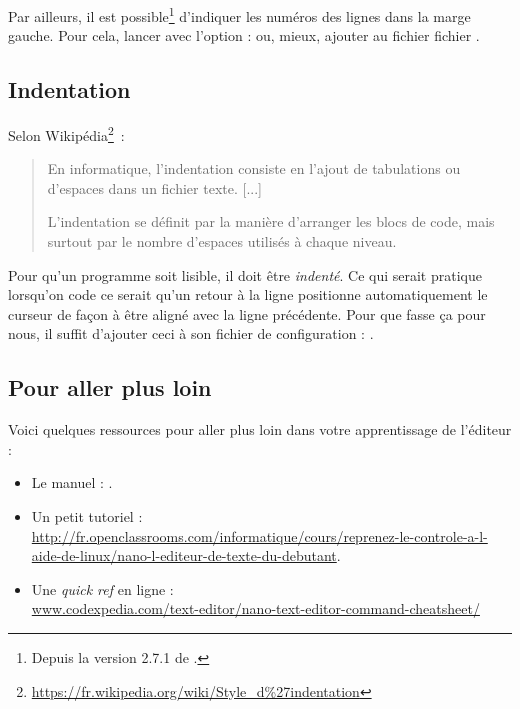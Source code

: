 \documentclass[a4paper,11pt]{style-esi/td}
\begin{document}
		Par ailleurs, il est possible\footnote{Depuis la version
		2.7.1 de .} d'indiquer les numéros des 
		lignes dans la
		marge gauche. Pour cela, lancer  avec l'option 
		 :  ou, mieux, 
	    ajouter  au fichier 
	    fichier .
			
	\subsection{Indentation}
				 
        Selon Wikipédia\footnote{\url{https://fr.wikipedia.org/wiki/Style_d\%27indentation}}~:
        \begin{quote}
        \og{}En informatique, l'indentation consiste en l'ajout de tabulations ou 
        d'espaces dans un fichier texte. [...]

        L'indentation se définit par la manière d'arranger les blocs de code, 
        mais surtout par le nombre d'espaces utilisés à chaque niveau.\fg{} 
        \end{quote}
        
		Pour qu'un programme soit lisible, 
		il doit être \textit{indenté}. 
		Ce qui serait pratique lorsqu'on code ce serait qu'un retour à la ligne 
		positionne automatiquement le curseur de façon à être 
		aligné avec la ligne précédente. 
		Pour que  fasse ça pour nous, 
		il suffit d'ajouter	ceci à son fichier de configuration : .
			
	\subsection{Pour aller plus loin} 
		
		Voici quelques ressources pour aller plus loin dans votre apprentissage de l'éditeur :
		\begin{itemize}
		\item Le manuel : .
		\item Un petit tutoriel : 
			\\{\tiny\url{http://fr.openclassrooms.com/informatique/cours/reprenez-le-controle-a-l-aide-de-linux/nano-l-editeur-de-texte-du-debutant}}.
		\item Une \textit{quick ref} en ligne : 
			\\{\small\url{www.codexpedia.com/text-editor/nano-text-editor-command-cheatsheet/}}
		\end{itemize}	
\end{document}
